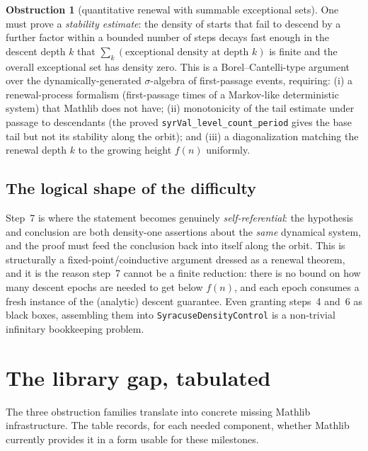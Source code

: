 \documentclass[11pt]{article}
\theoremstyle{plain}
\theoremstyle{definition}
\newtheorem{obstruction}[thm]{Obstruction}
\theoremstyle{remark}
\newcommand{\code}[1]{\texttt{\small #1}}
\begin{document}
\begin{obstruction}[quantitative renewal with summable exceptional sets]
\label{obs:renewal}
One must prove a \emph{stability estimate}: the density of starts that fail to
descend by a further factor within a bounded number of steps decays fast enough
in the descent depth $k$ that $\sum_k(\text{exceptional density at depth }k)$ is
finite and the overall exceptional set has density zero. This is a
Borel--Cantelli-type argument over the dynamically-generated
$\sigma$-algebra of first-passage events, requiring: (i) a renewal-process
formalism (first-passage times of a Markov-like deterministic system) that
Mathlib does not have; (ii) monotonicity of the tail estimate under passage to
descendants (the proved \code{syrVal\_level\_count\_period} gives the base tail
but not its stability along the orbit); and (iii) a diagonalization matching the
renewal depth $k$ to the growing height $f(n)$ uniformly.
\end{obstruction}

\subsection{The logical shape of the difficulty}

Step~7 is where the statement becomes genuinely \emph{self-referential}: the
hypothesis and conclusion are both density-one assertions about the \emph{same}
dynamical system, and the proof must feed the conclusion back into itself along
the orbit. This is structurally a fixed-point/coinductive argument dressed as a
renewal theorem, and it is the reason step~7 cannot be a finite reduction: there
is no bound on how many descent epochs are needed to get below $f(n)$, and each
epoch consumes a fresh instance of the (analytic) descent guarantee. Even
granting steps~4 and~6 as black boxes, assembling them into
\code{SyracuseDensityControl} is a non-trivial infinitary bookkeeping problem.

\section{The library gap, tabulated}
\label{sec:library}

The three obstruction families translate into concrete missing Mathlib
infrastructure. The table records, for each needed component, whether Mathlib
currently provides it in a form usable for these milestones.
\end{document}
